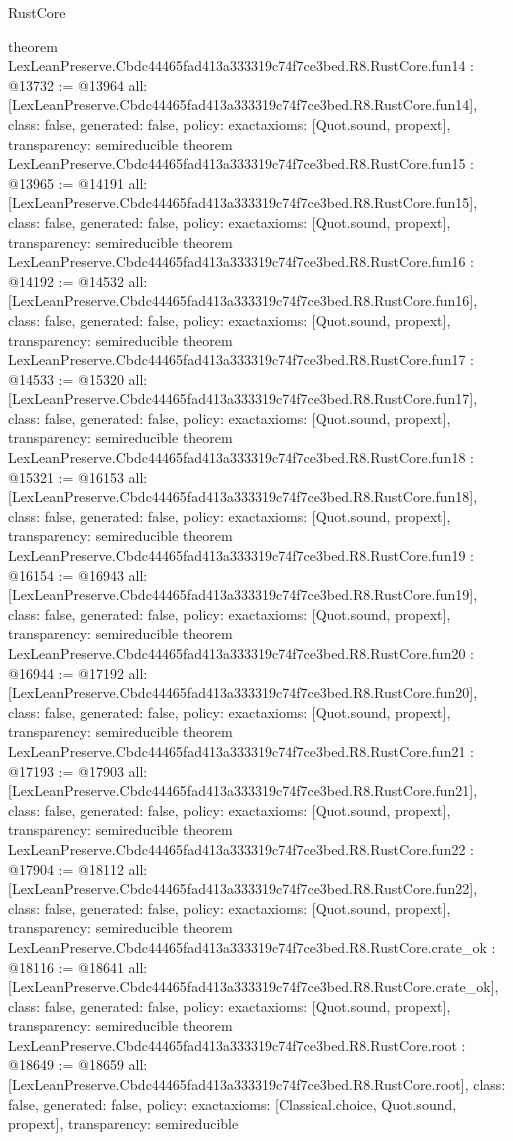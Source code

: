 \begin{lexlean}{RustCore}
\begin{coremodule}
{}
theorem LexLeanPreserve.Cbdc44465fad413a333319c74f7ce3bed.R8.RustCore.fun14 : @13732 := @13964 {
  all: [LexLeanPreserve.Cbdc44465fad413a333319c74f7ce3bed.R8.RustCore.fun14],
  class: false,
  generated: false,
  policy: exact{axioms: [Quot.sound, propext]},
  transparency: semireducible
}
theorem LexLeanPreserve.Cbdc44465fad413a333319c74f7ce3bed.R8.RustCore.fun15 : @13965 := @14191 {
  all: [LexLeanPreserve.Cbdc44465fad413a333319c74f7ce3bed.R8.RustCore.fun15],
  class: false,
  generated: false,
  policy: exact{axioms: [Quot.sound, propext]},
  transparency: semireducible
}
theorem LexLeanPreserve.Cbdc44465fad413a333319c74f7ce3bed.R8.RustCore.fun16 : @14192 := @14532 {
  all: [LexLeanPreserve.Cbdc44465fad413a333319c74f7ce3bed.R8.RustCore.fun16],
  class: false,
  generated: false,
  policy: exact{axioms: [Quot.sound, propext]},
  transparency: semireducible
}
theorem LexLeanPreserve.Cbdc44465fad413a333319c74f7ce3bed.R8.RustCore.fun17 : @14533 := @15320 {
  all: [LexLeanPreserve.Cbdc44465fad413a333319c74f7ce3bed.R8.RustCore.fun17],
  class: false,
  generated: false,
  policy: exact{axioms: [Quot.sound, propext]},
  transparency: semireducible
}
theorem LexLeanPreserve.Cbdc44465fad413a333319c74f7ce3bed.R8.RustCore.fun18 : @15321 := @16153 {
  all: [LexLeanPreserve.Cbdc44465fad413a333319c74f7ce3bed.R8.RustCore.fun18],
  class: false,
  generated: false,
  policy: exact{axioms: [Quot.sound, propext]},
  transparency: semireducible
}
theorem LexLeanPreserve.Cbdc44465fad413a333319c74f7ce3bed.R8.RustCore.fun19 : @16154 := @16943 {
  all: [LexLeanPreserve.Cbdc44465fad413a333319c74f7ce3bed.R8.RustCore.fun19],
  class: false,
  generated: false,
  policy: exact{axioms: [Quot.sound, propext]},
  transparency: semireducible
}
theorem LexLeanPreserve.Cbdc44465fad413a333319c74f7ce3bed.R8.RustCore.fun20 : @16944 := @17192 {
  all: [LexLeanPreserve.Cbdc44465fad413a333319c74f7ce3bed.R8.RustCore.fun20],
  class: false,
  generated: false,
  policy: exact{axioms: [Quot.sound, propext]},
  transparency: semireducible
}
theorem LexLeanPreserve.Cbdc44465fad413a333319c74f7ce3bed.R8.RustCore.fun21 : @17193 := @17903 {
  all: [LexLeanPreserve.Cbdc44465fad413a333319c74f7ce3bed.R8.RustCore.fun21],
  class: false,
  generated: false,
  policy: exact{axioms: [Quot.sound, propext]},
  transparency: semireducible
}
theorem LexLeanPreserve.Cbdc44465fad413a333319c74f7ce3bed.R8.RustCore.fun22 : @17904 := @18112 {
  all: [LexLeanPreserve.Cbdc44465fad413a333319c74f7ce3bed.R8.RustCore.fun22],
  class: false,
  generated: false,
  policy: exact{axioms: [Quot.sound, propext]},
  transparency: semireducible
}
theorem LexLeanPreserve.Cbdc44465fad413a333319c74f7ce3bed.R8.RustCore.crate_ok : @18116 := @18641 {
  all: [LexLeanPreserve.Cbdc44465fad413a333319c74f7ce3bed.R8.RustCore.crate_ok],
  class: false,
  generated: false,
  policy: exact{axioms: [Quot.sound, propext]},
  transparency: semireducible
}
theorem LexLeanPreserve.Cbdc44465fad413a333319c74f7ce3bed.R8.RustCore.root : @18649 := @18659 {
  all: [LexLeanPreserve.Cbdc44465fad413a333319c74f7ce3bed.R8.RustCore.root],
  class: false,
  generated: false,
  policy: exact{axioms: [Classical.choice, Quot.sound, propext]},
  transparency: semireducible
}


\end{coremodule}
\end{lexlean}
